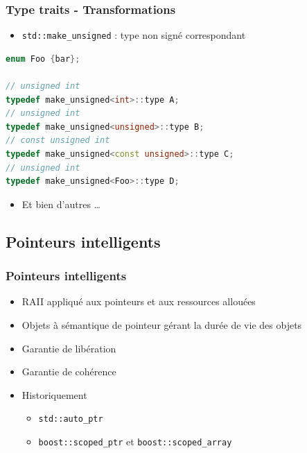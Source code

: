 \documentclass[C++.tex]{subfiles}
\begin{document}
\begin{frame}[fragile]
	\frametitle{Type traits - Transformations}
	\begin{itemize}
		\item \lstinline|std::make_unsigned| : type non signé correspondant
	\end{itemize}

	\begin{lstlisting}[language=C++]
enum Foo {bar};

// unsigned int
typedef make_unsigned<int>::type A;
// unsigned int
typedef make_unsigned<unsigned>::type B;
// const unsigned int
typedef make_unsigned<const unsigned>::type C;
// unsigned int
typedef make_unsigned<Foo>::type D;\end{lstlisting}

	\begin{itemize}
		\item Et bien d'autres \ldots
	\end{itemize}
\end{frame}

\subsection*{Pointeurs intelligents}
\begin{frame}[fragile]
	\frametitle{Pointeurs intelligents}
	\begin{itemize}
		\item RAII appliqué aux pointeurs et aux ressources allouées
		\item Objets à sémantique de pointeur gérant la durée de vie des objets
		\item Garantie de libération
		\item Garantie de cohérence
		\item Historiquement
		\begin{itemize}
			\item \lstinline|std::auto_ptr|
			\item \lstinline|boost::scoped_ptr| et \lstinline|boost::scoped_array|
		\end{itemize}
	\end{itemize}
\end{frame}
\end{document}
